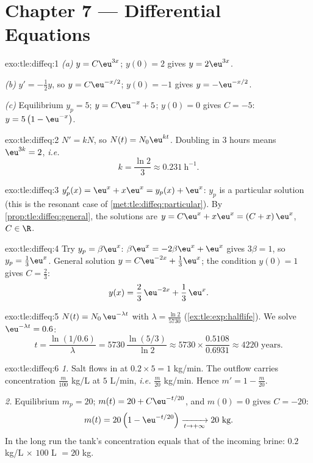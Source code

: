 \section*{Chapter 7 --- Differential Equations}

\begin{solution}{exo:tle:diffeq:1}
\emph{(a)} $y = C\eu^{3x}$; $y(0) = 2$ gives $y = 2\eu^{3x}$.

\emph{(b)} $y' = -\frac12 y$, so $y = C\eu^{-x/2}$; $y(0) = -1$ gives
$y = -\eu^{-x/2}$.

\emph{(c)} Equilibrium $y_p = 5$; $y = C\eu^{-x} + 5$; $y(0) = 0$ gives
$C = -5$: $y = 5\left(1 - \eu^{-x}\right)$.
\end{solution}

\begin{solution}{exo:tle:diffeq:2}
$N' = kN$, so $N(t) = N_0 \eu^{kt}$. Doubling in $3$ hours means
$\eu^{3k} = 2$, \emph{i.e.}
\[
k = \frac{\ln 2}{3} \approx 0.231\ \text{h}^{-1}.
\]
\end{solution}

\begin{solution}{exo:tle:diffeq:3}
$y_p'(x) = \eu^x + x\eu^x = y_p(x) + \eu^x$: $y_p$ is a particular solution
(this is the resonant case of \cref{met:tle:diffeq:particular}). By
\cref{prop:tle:diffeq:general}, the solutions are
$y = C\eu^{x} + x\eu^{x} = (C + x)\,\eu^x$, $C \in \R$.
\end{solution}

\begin{solution}{exo:tle:diffeq:4}
Try $y_p = \beta\eu^x$: $\beta\eu^x = -2\beta\eu^x + \eu^x$ gives
$3\beta = 1$, so $y_p = \frac13\eu^x$. General solution
$y = C\eu^{-2x} + \frac13\eu^{x}$; the condition $y(0) = 1$ gives
$C = \frac23$:
\[
y(x) = \frac{2}{3}\,\eu^{-2x} + \frac{1}{3}\,\eu^{x}.
\]
\end{solution}

\begin{solution}{exo:tle:diffeq:5}
$N(t) = N_0\,\eu^{-\lambda t}$ with $\lambda = \frac{\ln 2}{5730}$
(\cref{ex:tle:exp:halflife}). We solve $\eu^{-\lambda t} = 0.6$:
\[
t = \frac{\ln(1/0.6)}{\lambda} = 5730\,\frac{\ln(5/3)}{\ln 2}
\approx 5730 \times \frac{0.5108}{0.6931} \approx 4220 \text{ years}.
\]
\end{solution}

\begin{solution}{exo:tle:diffeq:6}
\emph{1.} Salt flows in at $0.2 \times 5 = 1$ kg/min. The outflow carries
concentration $\frac{m}{100}$ kg/L at $5$ L/min, \emph{i.e.} $\frac{m}{20}$
kg/min. Hence $m' = 1 - \frac{m}{20}$.

\emph{2.} Equilibrium $m_p = 20$; $m(t) = 20 + C\eu^{-t/20}$, and
$m(0) = 0$ gives $C = -20$:
\[
m(t) = 20\left(1 - \eu^{-t/20}\right) \xrightarrow[t\to+\infty]{} 20 \text{ kg}.
\]
In the long run the tank's concentration equals that of the incoming brine:
$0.2$ kg/L $\times$ $100$ L $= 20$ kg.
\end{solution}

